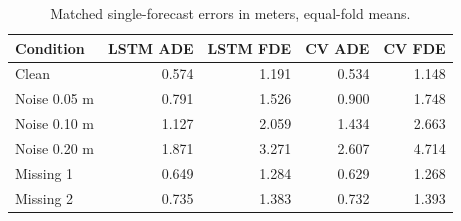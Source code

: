 \begin{table}[ht]\centering\small
\begin{tabular}{lrrrr}\toprule Condition & LSTM ADE & LSTM FDE & CV ADE & CV FDE \\ \midrule
Clean & 0.574 & 1.191 & 0.534 & 1.148 \\
Noise 0.05 m & 0.791 & 1.526 & 0.900 & 1.748 \\
Noise 0.10 m & 1.127 & 2.059 & 1.434 & 2.663 \\
Noise 0.20 m & 1.871 & 3.271 & 2.607 & 4.714 \\
Missing 1 & 0.649 & 1.284 & 0.629 & 1.268 \\
Missing 2 & 0.735 & 1.383 & 0.732 & 1.393 \\
\bottomrule\end{tabular}
\caption{Matched single-forecast errors in meters, equal-fold means.}\label{tab:individual_lstm_matched}\end{table}
